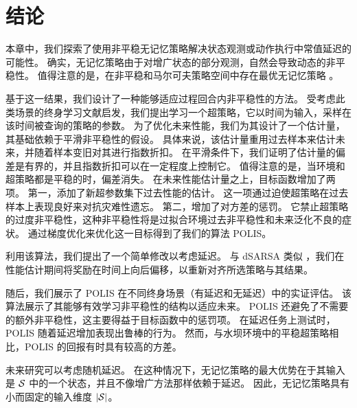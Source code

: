 \section{结论}
本章中，我们探索了使用非平稳无记忆策略解决状态观测或动作执行中常值延迟的可能性。
确实，无记忆策略由于对增广状态的部分观测，自然会导致动态的非平稳性。
值得注意的是，在非平稳和马尔可夫策略空间中存在最优无记忆策略 \cite[Theorem~5.1]{derman2021acting}。

基于这一结果，我们设计了一种能够适应过程回合内非平稳性的方法。
受考虑此类场景的终身学习文献启发，我们提出学习一个超策略，它以时间为输入，采样在该时间被查询的策略的参数。
为了优化未来性能，我们为其设计了一个估计量，其基础依赖于平滑非平稳性的假设。
具体来说，该估计量重用过去样本来估计未来，并随着样本变旧对其进行指数折扣。
在平滑条件下，我们证明了估计量的偏差是有界的，并且指数折扣可以在一定程度上控制它。
值得注意的是，当环境和超策略都是平稳的时，偏差消失。
在未来性能估计量之上，目标函数增加了两项。
第一，添加了新超参数集下过去性能的估计。
这一项通过迫使超策略在过去样本上表现良好来对抗灾难性遗忘。
第二，增加了对方差的惩罚。
它禁止超策略的过度非平稳性，这种非平稳性将是过拟合环境过去非平稳性和未来泛化不良的症状。
通过梯度优化来优化这一目标得到了我们的算法 POLIS。

利用该算法，我们提出了一个简单修改以考虑延迟。
与 dSARSA 类似 \cite{schuitema2010control}，我们在性能估计期间将奖励在时间上向后偏移，以重新对齐所选策略与其结果。

随后，我们展示了 POLIS 在不同终身场景（有延迟和无延迟）中的实证评估。
该算法展示了其能够有效学习非平稳性的结构以适应未来。
POLIS 还避免了不需要的额外非平稳性，这主要得益于目标函数中的惩罚项。
在延迟任务上测试时，POLIS 随着延迟增加表现出鲁棒的行为。
然而，与水坝环境中的平稳超策略相比，POLIS 的回报有时具有较高的方差。

未来研究可以考虑随机延迟。
在这种情况下，无记忆策略的最大优势在于其输入是 $\mathcal{S}$ 中的一个状态，并且不像增广方法那样依赖于延迟。
因此，无记忆策略具有小而固定的输入维度 $\lvert \mathcal{S}\rvert$。
